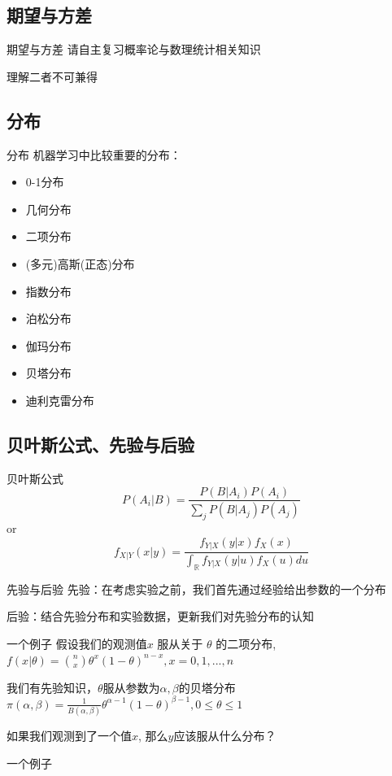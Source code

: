 \documentclass{ctexbeamer}
\begin{document}
\subsection{期望与方差}
\begin{frame}{期望与方差}
请自主复习概率论与数理统计相关知识

理解二者不可兼得
\end{frame}
\subsection{分布}
\begin{frame}{分布}
机器学习中比较重要的分布：
\begin{itemize}
\item 0-1分布
\item 几何分布
\item 二项分布
\item (多元)高斯(正态)分布
\item 指数分布
\item 泊松分布
\item 伽玛分布
\item 贝塔分布
\item 迪利克雷分布
\end{itemize}
\end{frame}

\subsection{贝叶斯公式、先验与后验}
\begin{frame}{贝叶斯公式}
$$P(A_i|B)=\frac{P(B|A_i)P(A_i)}{\sum_j P(B|A_j)P(A_j)}$$
or
$$f_{X|Y}(x|y) = \frac{f_{Y|X}(y|x)f_X(x)}{\int_{\mathbb R}f_{Y|X}(y|u)f_X(u)du}$$
\end{frame}
\begin{frame}{先验与后验}
先验：在考虑实验之前，我们首先通过经验给出参数的一个分布

后验：结合先验分布和实验数据，更新我们对先验分布的认知
\end{frame}

\begin{frame}{一个例子}
假设我们的观测值$x$ 服从关于 $\theta$ 的二项分布, $f(x|\theta)=\binom nx \theta^x(1-\theta)^{n-x},x=0,1,...,n$

我们有先验知识，$\theta$服从参数为$\alpha,\beta$的贝塔分布$\pi(\alpha, \beta)=\frac1{B(\alpha,\beta)}\theta^{\alpha-1}(1-\theta)^{\beta-1},0\leq\theta\leq 1$

如果我们观测到了一个值$x$, 那么$y$应该服从什么分布？
\end{frame}
\begin{frame}{一个例子}

\end{frame}
\end{document}
